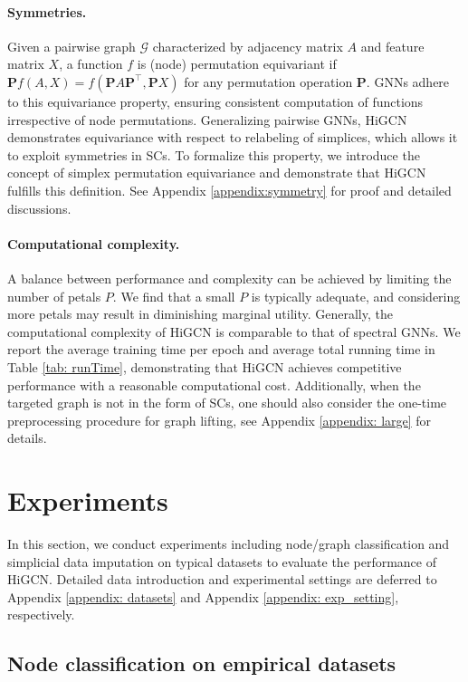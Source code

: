 \documentclass[letterpaper]{article} \usepackage{aaai24}
\theoremstyle{plain}
\theoremstyle{definition}
\theoremstyle{remark}
\begin{document}
\paragraph{Symmetries.}
Given a pairwise graph $\mathcal{G}$ characterized by adjacency matrix $A$ and feature matrix $X$, a function $f$ is (node) permutation equivariant if $\mathbf{P}f(A, X)=f(\mathbf{P}A\mathbf{P}^\top, \mathbf{P}X)$ for any permutation operation $\mathbf{P}$. 
GNNs adhere to this equivariance property, ensuring consistent computation of functions irrespective of node permutations.
Generalizing pairwise GNNs, HiGCN demonstrates equivariance with respect to relabeling of simplices, which allows it to exploit symmetries in SCs. 
To formalize this property, we introduce the concept of simplex permutation equivariance and demonstrate that HiGCN fulfills this definition. See Appendix  \ref{appendix:symmetry} for proof and detailed discussions.






\paragraph{Computational complexity.}
A balance between performance and complexity can be achieved by limiting the number of petals $P$. We find that a small $P$ is typically adequate, and considering more petals may result in diminishing marginal utility.
Generally, the computational complexity of HiGCN is comparable to that of spectral GNNs. 
We report the average training time per epoch and average total running time in Table \ref{tab: runTime}, demonstrating that HiGCN achieves competitive performance with a reasonable computational cost.
Additionally, when the targeted graph is not in the form of SCs, one should also consider the one-time preprocessing procedure for graph lifting, see Appendix \ref{appendix: large} for details. 
\section{Experiments}
In this section, we conduct experiments including node/graph classification and simplicial data imputation on typical datasets to evaluate the performance of HiGCN. Detailed data introduction and experimental settings are deferred to Appendix \ref{appendix: datasets} and Appendix \ref{appendix: exp_setting}, respectively.




\subsection{Node classification on empirical datasets}
\end{document}
